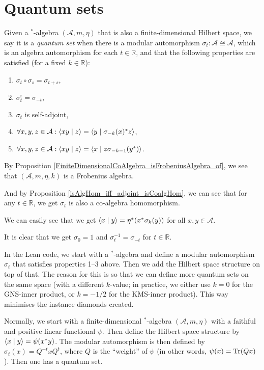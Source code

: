 \chapter{Quantum sets}

 \begin{definition}\label{QuantumSet}
  \leanok
  Given a $^*$-algebra $(\mathcal{A},m,\eta)$ that is also a finite-dimensional Hilbert space,
  we say it is a \textit{quantum set} when there is a modular automorphism $\sigma_t\colon\mathcal{A}\cong\mathcal{A}$, which is an algebra automorphism for each $t\in\mathbb{R}$, and that the following properties are satisfied (for a fixed $k\in\mathbb{R}$):
  \begin{enumerate}
   \item $\sigma_t\circ\sigma_s=\sigma_{t+s}$,
   \item $\sigma_t^{\operatorname{r}}=\sigma_{-t}$,
   \item $\sigma_t$ is self-adjoint,
   \item $\forall{x,y,z}\in\mathcal{A}:\left\langle xy \mid z\right\rangle=\left\langle y \mid \sigma_{-k}(x)^*z\right\rangle$,
   \item $\forall{x,y,z}\in\mathcal{A}:\left\langle xy \mid z\right\rangle=\left\langle x \mid z\sigma_{-k-1}(y^*)\right\rangle$.
  \end{enumerate}
  By Proposition \ref{FiniteDimensionalCoAlgebra_isFrobeniusAlgebra_of}, we see that $(\mathcal{A},m,\eta,k)$ is a Frobenius algebra.

  And by Proposition \ref{isAlgHom_iff_adjoint_isCoalgHom}, we can see that for any $t\in\mathbb{R}$, we get $\sigma_t$ is also a co-algebra homomorphism.

  We can easily see that we get $\left\langle x \mid y\right\rangle=\eta^*(x^*\sigma_k(y))$ for all $x,y\in\mathcal{A}$.

  It is clear that we get $\sigma_0=1$ and $\sigma_{t}^{-1}=\sigma_{-t}$ for $t\in\mathbb{R}$.
 \end{definition}
 \begin{remark}
  In the Lean code, we start with a $^*$-algebra and define a modular automorphism $\sigma_t$ that satisfies properties 1--3 above.
  Then we add the Hilbert space structure on top of that.
  The reason for this is so that we can define more quantum sets on the same space (with a different $k$-value; in practice, we either use $k=0$ for the GNS-inner product, or $k=-1/2$ for the KMS-inner product).
  This way minimises the instance diamonds created.

  Normally, we start with a finite-dimensional $^*$-algebra $(\mathcal{A},m,\eta)$ with a faithful and positive linear functional $\psi$. Then define the Hilbert space structure by $\left\langle x \mid y\right\rangle=\psi(x^*y)$.
  The modular automorphism is then defined by $\sigma_t(x)=Q^{-t}xQ^t$, where $Q$ is the ``weight'' of $\psi$ (in other words, $\psi(x)=\operatorname{Tr}(Q x)$).
  Then one has a quantum set.
 \end{remark}

